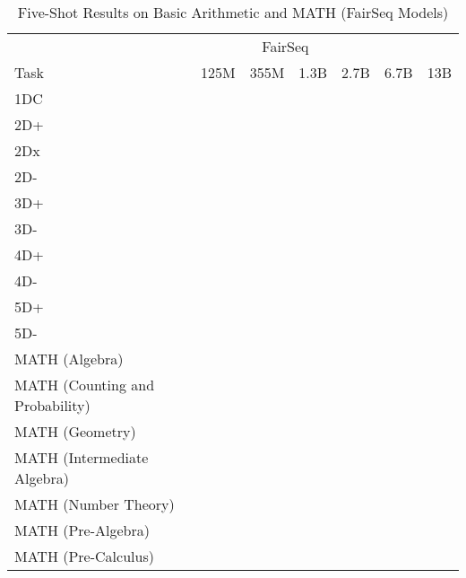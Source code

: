 \documentclass[11pt]{article}
\begin{document}
{\begin{landscape}
\begin{table*}
\centering \begin{tabular}{l c c c c c c } \\ 
& \multicolumn{4}{c}{FairSeq} \\ 
Task & 125M & 355M & 1.3B & 2.7B & 6.7B & 13B \\ \toprule
1DC &  &  &  &  &  &  \\ 
2D+ &  &  &  &  &  &  \\ 
2Dx &  &  &  &  &  &  \\ 
2D- &  &  &  &  &  &  \\ 
3D+ &  &  &  &  &  &  \\ 
3D- &  &  &  &  &  &  \\ 
4D+ &  &  &  &  &  &  \\ 
4D- &  &  &  &  &  &  \\ 
5D+ &  &  &  &  &  &  \\ 
5D- &  &  &  &  &  &  \\ 
MATH (Algebra) &  &  &  &  &  &  \\ 
MATH (Counting and Probability) &  &  &  &  &  &  \\ 
MATH (Geometry) &  &  &  &  &  &  \\ 
MATH (Intermediate Algebra) &  &  &  &  &  &  \\ 
MATH (Number Theory) &  &  &  &  &  &  \\ 
MATH (Pre-Algebra) &  &  &  &  &  &  \\ 
MATH (Pre-Calculus) &  &  &  &  &  &  \\ 
\bottomrule 
\end{tabular}
\caption{Five-Shot Results on Basic Arithmetic and MATH (FairSeq Models)}
\label{tab:math_fairseq_5}
\end{table*}
\end{landscape}}
\end{document}
